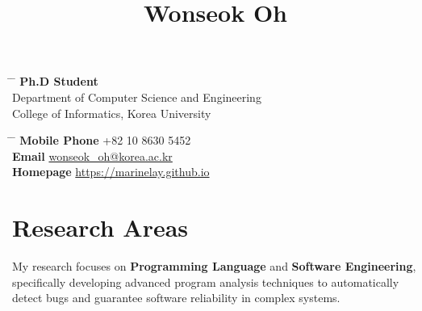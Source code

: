 \documentclass[10pt]{article} %
\begin{document}

\title{Wonseok Oh} %


\parbox{0.5\textwidth}{ %
\begin{tabbing} %
\hspace{3cm} \= \hspace{4cm} \= \kill %
\textbf{Ph.D Student} \\
Department of Computer Science and Engineering \\
College of Informatics, Korea University
\end{tabbing}}
\hfill %
\parbox{0.5\textwidth}{ %
\begin{tabbing} %
\hspace{3cm} \= \hspace{4cm} \= \kill %
{\bf Mobile Phone} \> +82 10 8630 5452 \\ %
{\bf Email} \> \href{mailto:wonseok_oh@korea.ac.kr}{wonseok\_oh@korea.ac.kr} \\ %
{\bf Homepage} \> \href{https://marinelay.github.io}{https://marinelay.github.io}
\end{tabbing}}


\section{Research Areas}

My research focuses on \textbf{Programming Language} and \textbf{Software Engineering}, specifically developing advanced program analysis techniques to automatically detect bugs and guarantee software reliability in complex systems.
\end{document}
